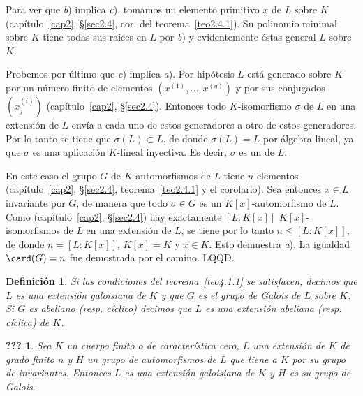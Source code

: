 \documentclass[bibtotoc,leqno,spanish]{amsbook}
\let\emph\relax %
\newcommand{\QED}{LQQD.}
\numberwithin{equation}{section}
\theoremstyle{note}
\newtheorem{definition}{Definici\'on}
\theoremstyle{note}
\newcommand{\namedname}{???}
\newtheorem*{namedthm}{\namedname}
\newenvironment{named}[1]%
	{\renewcommand{\namedname}{#1}%
	\begin{namedthm}}%
	{\end{namedthm}}
\theoremstyle{rem}
\numberwithin{theorem}{section}
\numberwithin{proposition}{section}
\numberwithin{definition}{section}
\numberwithin{lemma}{section}
\numberwithin{corollary}{section}
\numberwithin{example}{section}
\numberwithin{footnote}{section}%
\begin{document}
Para ver que \textit{b}) implica {\itshape c}), tomamos un elemento primitivo $x$ de $L$ sobre $K$
(cap\'itulo~\ref{cap2}, \S\ref{sec2.4}, cor. del teorema~\ref{teo2.4.1}). Su polinomio minimal sobre $K$ tiene todas sus ra\'ices en
$L$ por {\itshape b}) y evidentemente \'estas general $L$ sobre $K$.

Probemos por \'ultimo que {\itshape c}) implica {\itshape a}). Por hip\'otesis $L$ est\'a generado sobre $K$
por un n\'umero finito de elementos $(x^{(1)},\dots,x^{(q)})$ y por sus conjugados $(x_{j}^{(i)})$
(cap\'itulo~\ref{cap2}, \S\ref{sec2.4}). Entonces todo $K$-isomorfismo $\sigma$ de $L$ en una extensi\'on de $L$
env\'ia a cada uno de estos generadores a otro de estos generadores. Por lo tanto se tiene que $\sigma(L)\subset L$,
de donde $\sigma(L) =L$ por \'algebra lineal, ya que $\sigma$ es una aplicaci\'on $K$-lineal inyectiva. Es decir,
$\sigma$ es un \emph{$K$-automorfismo} de $L$.

En este caso el grupo $G$ de $K$-automorfismos de $L$ tiene $n$ elementos (cap\'itulo~\ref{cap2}, \S\ref{sec2.4}, teorema~\ref{teo2.4.1} y
el corolario). Sea entonces $x\in L$ invariante por $G$, de manera que todo $\sigma\in G$ es un $K[x]$-automorfismo
de $L$. Como (cap\'itulo~\ref{cap2}, \S\ref{sec2.4}) hay exactamente $[L:K[x]]$ $K[x]$-isomorfismos de $L$ en una
extensi\'on de $L$, se tiene por lo tanto $n\leq[L:K[x]]$, de donde $n=[L:K[x]]$, $K[x] = K$ y
$x\in K$. Esto demuestra {\itshape a}). La igualdad $\card(G) = n$ fue demostrada por el camino. \QED

\begin{definition}
Si las condiciones del teorema~\ref{teo4.1.1} se satisfacen, decimos que $L$ es una extensi\'on galoisiana de $K$ y que
$G$ es el grupo de Galois de $L$ sobre $K$. Si $G$ es abeliano (resp. c\'iclico) decimos que $L$ es una
extensi\'on abeliana (resp. c\'iclica) de $K$.
\end{definition}

\begin{named}{Corolario del teorema 1}
Sea $K$ un cuerpo finito o de caracter\'istica cero, $L$ una extensi\'on de $K$ de grado finito $n$ y
$H$ un grupo de automorfismos de $L$ que tiene a $K$ por su grupo de invariantes. Entonces $L$ es una
extensi\'on galoisiana de $K$ y $H$ es su grupo de Galois.
\end{named}
\end{document}
